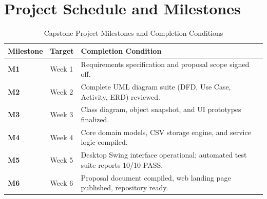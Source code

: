 \documentclass[11pt,a4paper]{article}
\begin{document}
\section{Project Schedule and Milestones}
\begin{table}[H]
    \centering
    \caption{Capstone Project Milestones and Completion Conditions}
    \begin{tabularx}{\textwidth}{llX}
        \toprule
        \textbf{Milestone} & \textbf{Target} & \textbf{Completion Condition} \\
        \midrule
        \textbf{M1} & Week 1 & Requirements specification and proposal scope signed off. \\
        \textbf{M2} & Week 2 & Complete UML diagram suite (DFD, Use Case, Activity, ERD) reviewed. \\
        \textbf{M3} & Week 3 & Class diagram, object snapshot, and UI prototypes finalized. \\
        \textbf{M4} & Week 4 & Core domain models, CSV storage engine, and service logic compiled. \\
        \textbf{M5} & Week 5 & Desktop Swing interface operational; automated test suite reports 10/10 PASS. \\
        \textbf{M6} & Week 6 & Proposal document compiled, web landing page published, repository ready. \\
        \bottomrule
    \end{tabularx}
\end{table}

\end{document}
